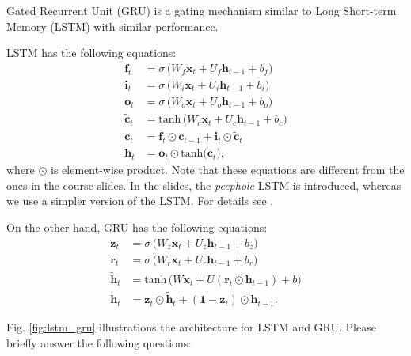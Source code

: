 \documentclass[10pt]{article}
\begin{document}
Gated Recurrent Unit (GRU) is a gating mechanism similar to Long Short-term Memory (LSTM) with similar performance. 

LSTM has the following equations:
\begin{equation*}
\begin{split}
\mathbf{f}_t &= \sigma\,\big(W_f \mathbf{x}_t + U_f \mathbf{h}_{t-1} + b_f\big) \\
\mathbf{i}_t &= \sigma\,\big(W_i \mathbf{x}_t + U_i \mathbf{h}_{t-1} + b_i\big) \\
\mathbf{o}_t &= \sigma\,\big(W_o \mathbf{x}_t + U_o \mathbf{h}_{t-1} + b_o\big) \\
\tilde{\mathbf{c}}_t &= \mathrm{tanh} \,\big(W_c \mathbf{x}_t + U_c \mathbf{h}_{t-1} + b_c\big) \\
\mathbf{c}_t &= \mathbf{f}_t \odot \mathbf{c}_{t-1} + \mathbf{i}_t \odot \tilde{\mathbf{c}}_t \\
\mathbf{h}_t &= \mathbf{o}_t \odot \mathrm{tanh}\big( \mathbf{c}_t\big) ,
\end{split}
\end{equation*}
where $\odot$ is element-wise product. Note that these equations are different from the ones in the course slides. In the slides, the {\em peephole} LSTM is introduced, whereas we use a simpler version of the LSTM. For details see \cite{hochreiter1997long}.

On the other hand, GRU has the following equations:
\begin{equation*}
\begin{split}
\mathbf{z}_t &= \sigma\,\big(W_z \mathbf{x}_t + U_z \mathbf{h}_{t-1} + b_z\big) \\
\mathbf{r}_t &= \sigma\,\big(W_r \mathbf{x}_t + U_r \mathbf{h}_{t-1} + b_r\big) \\
\tilde{\mathbf{h}}_t &= \mathrm{tanh} \,\big(W \mathbf{x}_t + U (\mathbf{r}_t \odot \mathbf{h}_{t-1}) + b\big) \\
\mathbf{h}_t &= \mathbf{z}_t \odot \tilde{\mathbf{h}}_t + (\mathbf{1} - \mathbf{z}_t)\odot \mathbf{h}_{t-1}.
\end{split}
\end{equation*}

Fig. \ref{fig:lstm_gru} illustrations the architecture for LSTM and GRU. Please briefly answer the following questions:
\end{document}
